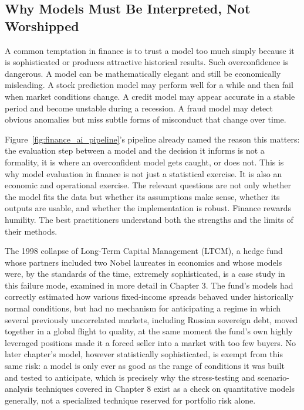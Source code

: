 \documentclass[../ai_in_finance]{subfiles}
\begin{document}
\subsection{Why Models Must Be Interpreted, Not Worshipped}

A common temptation in finance is to trust a model too much simply because it is sophisticated or produces attractive historical results. Such overconfidence is dangerous. A model can be mathematically elegant and still be economically misleading. A stock prediction model may perform well for a while and then fail when market conditions change. A credit model may appear accurate in a stable period and become unstable during a recession. A fraud model may detect obvious anomalies but miss subtle forms of misconduct that change over time.

Figure~\ref{fig:finance_ai_pipeline}'s pipeline already named the reason this matters: the evaluation step between a model and the decision it informs is not a formality, it is where an overconfident model gets caught, or does not.
This is why model evaluation in finance is not just a statistical exercise. It is also an economic and operational exercise. The relevant questions are not only whether the model fits the data but whether its assumptions make sense, whether its outputs are usable, and whether the implementation is robust. Finance rewards humility. The best practitioners understand both the strengths and the limits of their methods.

The 1998 collapse of Long-Term Capital Management (LTCM), a hedge fund whose partners included two Nobel laureates in economics and whose models were, by the standards of the time, extremely sophisticated, is a case study in this failure mode, examined in more detail in Chapter 3.
The fund's models had correctly estimated how various fixed-income spreads behaved under historically normal conditions, but had no mechanism for anticipating a regime in which several previously uncorrelated markets, including Russian sovereign debt, moved together in a global flight to quality, at the same moment the fund's own highly leveraged positions made it a forced seller into a market with too few buyers. No later chapter's model, however statistically sophisticated, is exempt from this same risk: a model is only ever as good as the range of conditions it was built and tested to anticipate, which is precisely why the stress-testing and scenario-analysis techniques covered in Chapter 8 exist as a check on quantitative models generally, not a specialized technique reserved for portfolio risk alone.
\end{document}

